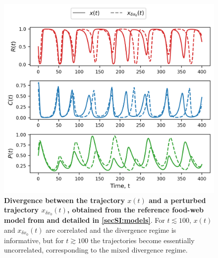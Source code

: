 \begin{figure}[h]
    \centering
    \includegraphics[]{figures/SI/perturbed_ICs.png}
    \caption{\textbf{Divergence between the trajectory $x(t)$ and a perturbed trajectory $x_{\delta x_0}(t)$, obtained from the reference food-web model from \cite{Hastings1991} and detailed in \cref{secSI:models}}. For $t \lesssim 100$, $x(t)$ and $x_{\delta x_0}(t)$ are correlated and the divergence regime is informative, but for $t \gtrsim 100$ the trajectories become essentially uncorrelated, corresponding to the mixed divergence regime.}
    \label{figSI:perturbed_ICs}
\end{figure}

\FloatBarrier

